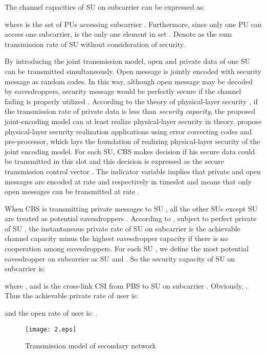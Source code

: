\documentclass[journal]{IEEEtran}
\begin{document}
 The channel capacities of SU  on subcarrier  can be expressed as:

 
 where   is the set of PUs accessing
 subcarrier . Furthermore, since only one PU can access one subcarrier,  is the only one
 element in set . Denote  as the sum transmission rate of SU  without consideration of security.

 By introducing the joint transmission model, open and private data of one SU can be transmitted simultaneously.
{ Open message is jointly encoded with security message as random codes. In this way, although open message may be decoded by eavesdroppers, security message would be perfectly secure if the channel fading is properly utilized \cite{mclaughlin2014applications}. According to the theory of physical-layer security \cite{wang2011power}, if  the transmission rate of private data is less than \emph{security capacity}, the proposed joint-encoding model can at least realize physical-layer security in theory. \cite{mclaughlin2013secure,argon2013pre} propose physical-layer security realization applications using error correcting codes and pre-processor, which lays the foundation of realizing physical-layer security of the joint encoding model. }
 For each SU, CBS makes decision  if his
secure data could be transmitted in this slot
and this decision is expressed as the secure transmission control vector . The
indicator variable  implies that  private and open messages are encoded at rate  and
  respectively in timeslot   and  means that only open messages can be transmitted at
rate .

When CBS is transmitting private messages to SU , all the other SUs except SU  are treated as potential eavesdroppers { \cite{wang2011power}}.
According to
\cite{emre2011control}, subject to perfect private of SU , the instantaneous private rate of SU  on
subcarrier  is the achievable channel capacity minus the highest eavesdropper capacity if there is no cooperation among
eavesdroppers. For each SU , we define the
most potential eavesdropper on subcarrier  as SU  and .  So the security capacity of SU  on subcarrier  is:
  
where ,  and  is the cross-link CSI
 from PBS to SU  on subcarrier . Obviously, .
Thus the achievable private rate of user  is:

and  the open rate of user  is: .



\begin{figure}
  \centering
\texttt{[image: 2.eps]}\\
  \caption{ Transmission model of secondary network}\label{sysfig:3}
\end{figure}
\end{document}
